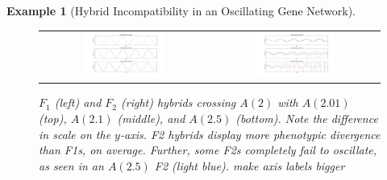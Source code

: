 \documentclass{article}
\newcommand{\plr}[1]{\todo[color=blue!25]{#1}}
\newcommand{\plri}[1]{{\color{blue}\it #1}}
\newcommand{\plr}[1]{{\color{blue}\it #1}}
\newcommand{\plri}[1]{\plr{#1}}
\newcommand{\1}{\mathbbm{1}}
\newtheorem{example}{Example}
\begin{document}
\begin{example}[Hybrid Incompatibility in an Oscillating Gene Network]


\begin{figure}[H]
  \centering
  \begin{tabular}{cc}
    \includegraphics[width=0.5\textwidth, height=0.25\paperheight]{F1_comparison} & 
    \includegraphics[width=0.5\textwidth, height=0.25\paperheight]{F2s_comparison2}
  \end{tabular}
  \caption{
    $F_1$ (left) and $F_2$ (right) hybrids crossing $A(2)$ with $A(2.01)$ (top), $A(2.1)$ (middle), and $A(2.5)$ (bottom).
    Note the difference in scale on the $y$-axis. F2 hybrids display more phenotypic divergence than F1s, on average. Further, some F2s completely fail to oscillate, as seen in an $A(2.5)$ F2 (light blue).
    \plri{make axis labels bigger}
  }
\end{figure}


\end{example}
\end{document}
